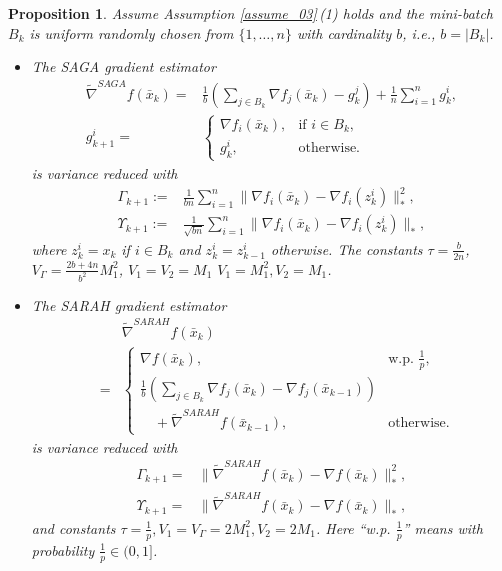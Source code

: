 \documentclass[letterpaper]{article} %
\newtheorem{proposition}{Proposition}
\begin{document}
	\begin{proposition}\label{vr_gra}
		Assume Assumption \ref{assume_03}\,(1)  holds and the mini-batch $B_{k}$ is uniform randomly chosen from   $\{ 1, \dots , n \}$ with cardinality $b$, i.e., $b=|B_{k}|$.
		\begin{itemize}
			\item The SAGA gradient estimator  \cite{DefazioBL14}
			\begin{align*}
				\tilde{\nabla}^{SAGA}f(\bar{x}_{k})=&\frac{1}{b}(\sum_{j\in B_{k}}\nabla f_{j}(\bar{x}_{k})-g_{k}^{j})+\frac{1}{n}\sum_{i=1}^{n}g_{k}^{i},\\
				g_{k+1}^{i}=&
				\begin{cases}
					\nabla f_{i}(\bar{x}_{k}), &\text{if }  i\in B_{k}, \\
					g_{k}^{i},&\text{otherwise.}
				\end{cases}
			\end{align*}%
			is variance reduced with
			\begin{align*}
				\Gamma_{k+1}:=&\frac{1}{bn}\sum_{i=1}^{n}\|\nabla f_{i}(\bar{x}_{k})-\nabla f_{i}(z_{k}^{i})\|_{*}^{2},\\
				\Upsilon_{k+1}:=&\frac{1}{\sqrt{bn}}\sum_{i=1}^{n}\|\nabla f_{i}(\bar{x}_{k})-\nabla f_{i}(z_{k}^{i})\|_{*},
			\end{align*}
			where $z_{k}^{i}=x_{k}$ if $i\in B_{k}$ and $z_{k}^{i}=z_{k-1}^{i}$ otherwise. The constants $\tau=\frac{b}{2n}$, $V_{\Gamma}=\frac{2b+4n}{b^{2}}M_{1}^{2}$, $V_{1}=V_{2}=M_{1}$ $V_{1}=M_{1}^2, V_{2}=M_{1}$.
			\item The SARAH gradient estimator \cite{NguyenLST17}
			\begin{eqnarray*}
				&&\tilde{\nabla}^{SARAH}f(\bar{x}_{k})\\
				&=&
				\left\{\begin{array}{ll}
					\nabla f(\bar{x}_{k}),\,\,&  \mbox{w.p.}\,\,\frac{1}{p},\\
					\frac{1}{b}(\underset{j\in B_{k}}{\sum}\nabla f_{j}(\bar{x}_{k})-\nabla f_{j}(\bar{x}_{k-1}))\\
					\quad+\tilde{\nabla}^{SARAH}f(\bar{x}_{k-1}),&\mbox{otherwise.}
				\end{array}\right.
			\end{eqnarray*}
			is variance reduced with
			\begin{align*}
				\Gamma_{k+1}=&\|\tilde{\nabla}^{SARAH}f(\bar{x}_{k})-\nabla f(\bar{x}_{k})\|_{*}^{2},\\
				\Upsilon_{k+1}=&\|\tilde{\nabla}^{SARAH}f(\bar{x}_{k})-\nabla f(\bar{x}_{k})\|_{*},
			\end{align*}
			and constants $\tau=\frac{1}{p}, V_{1}=V_{\Gamma}=2M_{1}^{2}, V_{2}=2M_{1}$. Here ``w.p. $\frac{1}{p}$'' means with probability $\frac{1}{p} \in (0, 1]$.
		\end{itemize}
	\end{proposition}
\end{document}
